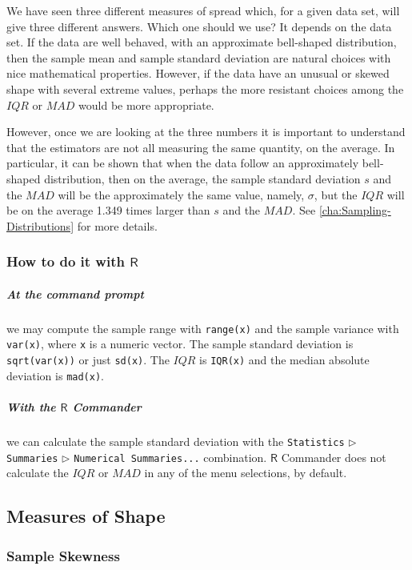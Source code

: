 \documentclass[captions=tableheading]{scrbook}
\begin{document}
We have seen three different measures of spread which, for a given data set, will give three different answers. Which one should we use? It depends on the data set. If the data are well behaved, with an approximate bell-shaped distribution, then the sample mean and sample standard deviation are natural choices with nice mathematical properties. However, if the data have an unusual or skewed shape with several extreme values, perhaps the more resistant choices among the \(IQR\) or \(MAD\) would be more appropriate.

However, once we are looking at the three numbers it is important to understand that the estimators are not all measuring the same quantity, on the average. In particular, it can be shown that when the data follow an approximately bell-shaped distribution, then on the average, the sample standard deviation \(s\) and the \(MAD\) will be the approximately the same value, namely, \(\sigma\), but the \(IQR\) will be on the average 1.349 times larger than \(s\) and the \(MAD\). See \ref{cha:Sampling-Distributions} for more details.
\subsubsection{How to do it with \(\mathsf{R}\)}
\label{sec-2-3-4-5}


\subparagraph*{At the command prompt}
we may compute the sample range with \texttt{range(x)} and the sample variance with \texttt{var(x)}, where \texttt{x} is a numeric vector. The sample standard deviation is \texttt{sqrt(var(x))} or just \texttt{sd(x)}. The \(IQR\) is \texttt{IQR(x)} and the median absolute deviation is \texttt{mad(x)}.

\subparagraph*{With the \(\mathsf{R}\) Commander}
we can calculate the sample standard deviation with the \texttt{Statistics} \(\triangleright\) \texttt{Summaries} \(\triangleright\) \texttt{Numerical Summaries...} combination. \(\mathsf{R}\) Commander does not calculate the \(IQR\) or \(MAD\) in any of the menu selections, by default.
\subsection{Measures of Shape}
\label{sec-2-3-5}
\label{sub:Measures-of-Shape}
\subsubsection{Sample Skewness}
\label{sec-2-3-5-1}
\end{document}
